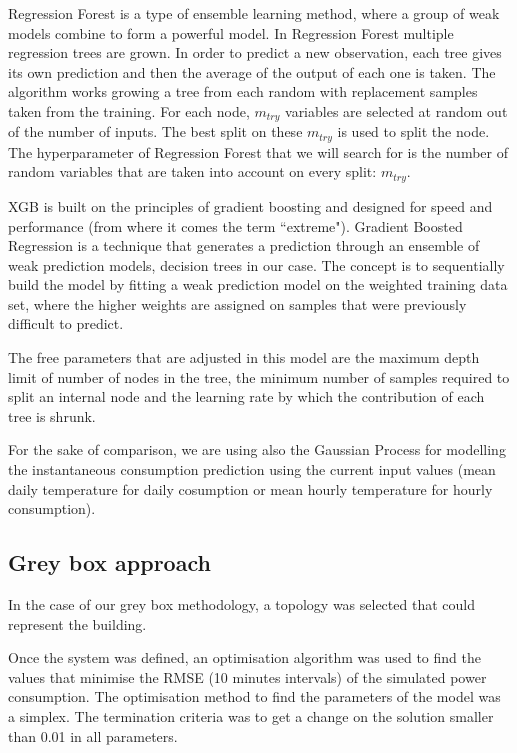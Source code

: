 \documentclass[10pt, conference, compsocconf]{IEEEtran}
\begin{document}
Regression Forest is a type of ensemble learning method, where a group of weak models combine to form a powerful model. In Regression Forest multiple regression trees are grown. In order to predict a new observation, each tree gives its own prediction and then the average of the output of each one is taken. The algorithm works growing a tree from each random with replacement samples taken from the training. For each node, $m_{try}$ variables are selected at random out of the number of inputs. The best split on these $m_{try}$ is used to split the node. The hyperparameter of Regression Forest that we will search for is the number of random variables that are taken into account on every split: $m_{try}$. 


XGB is built on the principles of gradient boosting and designed for speed and performance (from where it comes the term ``extreme").
Gradient Boosted Regression is a technique that generates a prediction through an ensemble of weak prediction models, decision trees in our case. The concept is to sequentially build the model by fitting a weak prediction model on the weighted training data set, where the higher weights are assigned on samples that were previously difficult to predict.

The free parameters that are adjusted in this model are the maximum depth limit of number of nodes in the tree, the minimum number of samples required to split an internal node and the learning rate by which the contribution of each tree is shrunk.

For the sake of comparison, we are using also the Gaussian Process for modelling the instantaneous consumption prediction using the current input values (mean daily temperature for daily cosumption or mean hourly temperature for hourly consumption).


\subsection{Grey box approach}

In the case of our grey box methodology, a topology was selected that could represent the building.

Once the system was defined, an optimisation algorithm was used to find the values that minimise the RMSE (10 minutes intervals) of the simulated power consumption. 
The optimisation method to find the parameters of the model was a simplex. The termination criteria was to get a change on the solution smaller than 0.01 in all parameters. %
\end{document}
